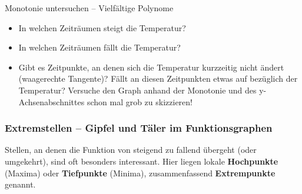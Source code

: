 \begin{aufgabenumgebung}{Monotonie untersuchen – Vielfältige Polynome}
\begin{enumerate}
        \begin{itemize}
            \item In welchen Zeiträumen steigt die Temperatur?
            \item In welchen Zeiträumen fällt die Temperatur?
            \item Gibt es Zeitpunkte, an denen sich die Temperatur kurzzeitig nicht ändert (waagerechte Tangente)? Fällt an diesen Zeitpunkten etwas auf bezüglich der Temperatur? Versuche den Graph anhand der Monotonie und des y-Achsenabschnittes schon mal grob zu skizzieren! 
        \end{itemize}
\end{enumerate}
\end{aufgabenumgebung}

\subsubsection{Extremstellen – Gipfel und Täler im Funktionsgraphen}

Stellen, an denen die Funktion von steigend zu fallend übergeht (oder umgekehrt), sind oft besonders interessant. Hier liegen lokale \textbf{Hochpunkte} (Maxima) oder \textbf{Tiefpunkte} (Minima), zusammenfassend \textbf{Extrempunkte} genannt.

